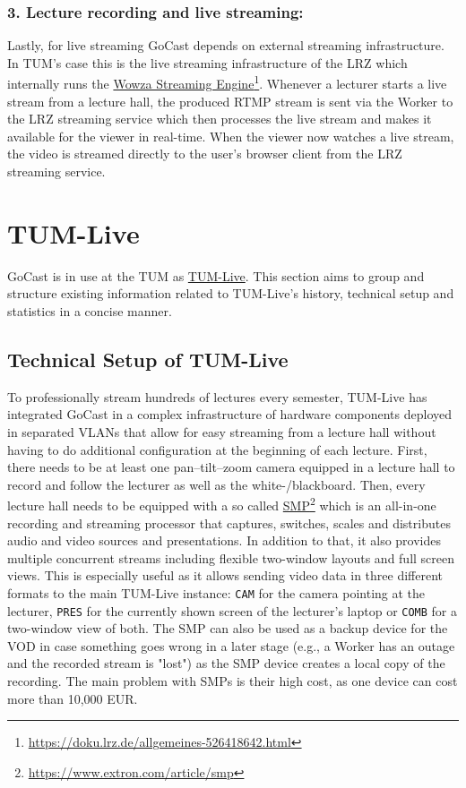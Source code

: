 \subsubsection{3. Lecture recording and live streaming:}
Lastly, for live streaming GoCast depends on external streaming infrastructure. In \ac{TUM}'s case this is the live streaming infrastructure of the \ac{LRZ} which internally runs the \href{https://doku.lrz.de/allgemeines-526418642.html}{Wowza Streaming Engine}\footnote{\url{https://doku.lrz.de/allgemeines-526418642.html}}. Whenever a lecturer starts a live stream from a lecture hall, the produced \ac{RTMP} stream is sent via the Worker to the \ac{LRZ} streaming service which then processes the live stream and makes it available for the viewer in real-time. When the viewer now watches a live stream, the video is streamed directly to the user's browser client from the \ac{LRZ} streaming service. 

\section{TUM-Live}

GoCast is in use at the \ac{TUM} as \href{https://tum.live}{TUM-Live}. This section aims to group and structure existing information related to TUM-Live's history, technical setup and statistics in a concise manner. 

\subsection{Technical Setup of TUM-Live}

To professionally stream hundreds of lectures every semester, TUM-Live has integrated GoCast in a complex infrastructure of hardware components deployed in separated VLANs that allow for easy streaming from a lecture hall without having to do additional configuration at the beginning of each lecture. 
First, there needs to be at least one pan–tilt–zoom camera equipped in a lecture hall to record and follow the lecturer as well as the white-/blackboard.
Then, every lecture hall needs to be equipped with a so called \href{https://www.extron.com/article/smp}{\ac{SMP}}\footnote{\url{https://www.extron.com/article/smp}} which is an all-in-one recording and streaming processor that captures, switches, scales and distributes audio and video sources and presentations. In addition to that, it also provides multiple concurrent streams including flexible two-window layouts and full screen views. This is especially useful as it allows sending video data in three different formats to the main TUM-Live instance: \texttt{CAM} for the camera pointing at the lecturer, \texttt{PRES} for the currently shown screen of the lecturer's laptop or \texttt{COMB} for a two-window view of both. The \ac{SMP} can also be used as a backup device for the \ac{VOD} in case something goes wrong in a later stage (e.g., a Worker has an outage and the recorded stream is "lost") as the \ac{SMP} device creates a local copy of the recording. The main problem with \ac{SMP}s is their high cost, as one device can cost more than 10,000 EUR.

